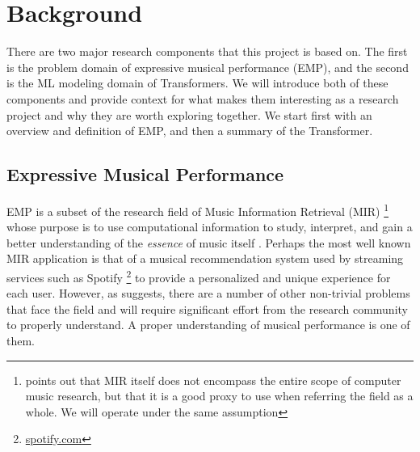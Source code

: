 \chapter{Background}\label{ch:ch2}


There are two major research components that this project is based on. The first is the problem domain of expressive musical performance (EMP), and the second is the ML modeling domain of Transformers. We will introduce both of these components and provide context for what makes them interesting as a research project and why they are worth exploring together. We start first with an overview and definition of EMP, and then a summary of the Transformer. 

\section{Expressive Musical Performance}\label{emp:sec}
EMP is a subset of the research field of Music Information Retrieval (MIR) \footnote{\citet{widmer2016getting} points out that MIR itself does not encompass the entire scope of computer music research, but that it is a good proxy to use when referring the field as a whole. We will operate under the same assumption} whose purpose is to use computational information to study, interpret, and gain a better understanding of the \emph{essence} of music itself \cite{widmer2016getting}. Perhaps the most well known MIR application is that of a musical recommendation system used by streaming services such as Spotify \footnote{\url{spotify.com}} to provide a personalized and unique experience for each user. However, as \citet{widmer2016getting} suggests, there are a number of other non-trivial problems that face the field and will require significant effort from the research community to properly understand. A proper understanding of musical performance is one of them. 

